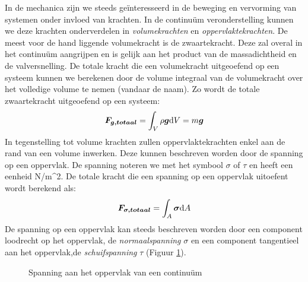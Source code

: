 In de mechanica zijn we steeds geïnteresseerd in de beweging en vervorming van systemen onder invloed van krachten. In de continuüm veronderstelling kunnen we deze krachten onderverdelen in \emph{volumekrachten} en \emph{oppervlaktekrachten}. De meest voor de hand liggende volumekracht is de zwaartekracht. Deze zal overal in het continuüm aangrijpen en is gelijk aan het product van de massadichtheid en de valversnelling. De totale kracht die een volumekracht uitgeoefend op een systeem kunnen we berekenen door de volume integraal van de volumekracht over het volledige volume te nemen (vandaar de naam). Zo wordt de totale zwaartekracht uitgeoefend op een systeem:
\begin{equation}
	\boldsymbol{F_{g,totaal}} = \int_V \rho \boldsymbol{g} \mathrm{d} V = m \boldsymbol{g}
	\label{eqn:volumekracht}
\end{equation}
In tegenstelling tot volume krachten zullen oppervlaktekrachten enkel aan de rand van een volume inwerken. Deze kunnen beschreven worden door de spanning op een oppervlak. De spanning noteren we met het symbool $\sigma$ of $\tau$ en heeft een eenheid  \unit{}{N/m^2}. De totale kracht die een spanning op een oppervlak uitoefent wordt berekend als: 
\begin{equation}
	\boldsymbol{F_{\sigma,totaal}} = \int_A \boldsymbol{\sigma} \mathrm{d} A
	\label{eqn:oppervlaktekracht}
\end{equation}
De spanning op een oppervlak kan steeds beschreven worden door een component loodrecht op het oppervlak, de \emph{normaalspanning} $\sigma$ en een component tangentieel aan het oppervlak,de \emph{schuifspanning} $\tau$ (Figuur \ref{fig:spanning}).
\begin{figure}[htb]
	\centering
	
	\caption{Spanning aan het oppervlak van een continuüm}
	\label{fig:spanning}
\end{figure}

